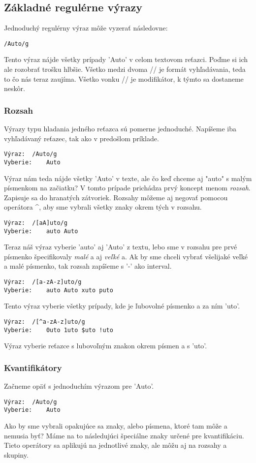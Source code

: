 \documentclass[10pt,twoside,slovak,a4paper]{article}
\begin{document}
\subsection{Základné regulérne výrazy}
Jednoduchý regulérny výraz môže vyzerať následovne:
\begin{verbatim}
/Auto/g
\end{verbatim}
Tento výraz nájde všetky prípady 'Auto' v celom textovom reťazci. Poďme si ich ale rozobrať trošku hlbšie. Všetko medzi dvoma // je formát vyhľadávania, teda to čo nás teraz zaujíma. Všetko vonku // je modifikátor, k týmto sa dostaneme neskôr.

\subsubsection{Rozsah}
Výrazy typu hladania jedného reťazca sú pomerne jednoduché. Napíšeme iba vyhľadávaný reťazec, tak ako v predošlom príklade.
\begin{verbatim}
Výraz:	/Auto/g
Vyberie:	Auto
\end{verbatim}
Výraz nám teda nájde všetky 'Auto' v texte, ale čo keď chceme aj "auto" s malým písmenkom na začiatku?
V tomto prípade prichádza prvý koncept menom \emph{rozsah}. Zapisuje sa do hranatých zátvoriek.
Rozsahy môžeme aj negovať pomocou operátora \string^, aby sme vybrali všetky znaky okrem tých v rozsahu.

\begin{verbatim}
Výraz:	/[aA]uto/g
Vyberie:	auto Auto
\end{verbatim}
Teraz náš výraz vyberie 'auto' aj 'Auto' z textu, lebo sme v rozsahu pre prvé písmenko špecifikovaly \emph{malé} a aj \emph{veľké} a.
Ak by sme chceli vybrať všelijaké veľké a malé písmenko, tak rozsah zapíšeme s '-' ako interval.

\begin{verbatim}
Výraz: 	/[a-zA-z]uto/g
Vyberie: 	auto Auto xuto puto
\end{verbatim}
Tento výraz vyberie všetky prípady, kde je ľubovolné písmenko a za ním 'uto'.

\begin{verbatim}
Výraz: 	/[^a-zA-z]uto/g
Vyberie: 	0uto 1uto $uto !uto
\end{verbatim}
Výraz vyberie reťazce s lubovoľným znakon okrem písmen a s 'uto'.

\subsubsection{Kvantifikátory}
Začneme opäť s jednoduchím výrazom pre 'Auto'.
\begin{verbatim}
Výraz:	/Auto/g
Vyberie:	Auto
\end{verbatim}
Ako by sme vybrali opakujúce sa znaky, alebo písmena, ktoré tam môže a nemusia byť?
Máme na to následujúci špeciálne znaky určené pre kvantifikáciu. Tieto operátory sa aplikujú na jednotlivé znaky, ale môžu aj na rozsahy a skupiny.
\end{document}
